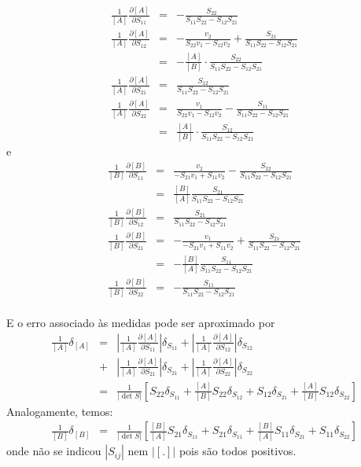 \begin{resol}
\begin{eqnarray}
\frac{1}{[ A ]}\frac{\partial [ A ]}{\partial S_{11}}&=&-\frac{S_{22}}{S_{11}S_{22}-S_{12}S_{21}}\\
\frac{1}{[ A ]}\frac{\partial [ A ]}{\partial S_{12}}&=&-\frac{v_2}{S_{22}v_1-S_{12}v_2}+\frac{S_{21}}{S_{11}S_{22}-S_{12}S_{21}}\\
&=&-\frac{[A]}{\left[B\right]}\cdot \frac{S_{22}}{S_{11}S_{22}-S_{12}S_{21}}\\
\frac{1}{[ A ]}\frac{\partial [ A ]}{\partial S_{21}}&=&\frac{S_{12}}{S_{11}S_{22}-S_{12}S_{21}}\\
\frac{1}{[ A ]}\frac{\partial [ A ]}{\partial S_{22}}&=&\frac{v_1}{S_{22}v_1-S_{12}v_2}-\frac{S_{11}}{S_{11}S_{22}-S_{12}S_{21}}\\
&=&\frac{[A]}{\left[B\right]}\cdot \frac{S_{12}}{S_{11}S_{22}-S_{12}S_{21}}
\end{eqnarray}
e
\begin{eqnarray}
\frac{1}{\left[ B \right]}\frac{\partial \left[ B \right]}{\partial S_{11}}&=&\frac{v_2}{-S_{21}v_1+S_{11}v_2}-\frac{S_{22}}{S_{11}S_{22}-S_{12}S_{21}}\\
&=&\frac{\left[B\right]}{[A]} \frac{S_{21}}{S_{11}S_{22}-S_{12}S_{21}}\\
\frac{1}{\left[ B \right]}\frac{\partial \left[ B \right]}{\partial S_{12}}&=&\frac{S_{21}}{S_{11}S_{22}-S_{12}S_{21}}\\
\frac{1}{\left[ B \right]}\frac{\partial \left[ B \right]}{\partial S_{21}}&=&-\frac{v_1}{-S_{21}v_1+S_{11}v_2}+\frac{S_{21}}{S_{11}S_{22}-S_{12}S_{21}}\\
&=&-\frac{\left[B\right]}{[A]}\frac{S_{11}}{S_{11}S_{22}-S_{12}S_{21}}\\
\frac{1}{\left[ B \right]}\frac{\partial \left[ B \right]}{\partial S_{22}}&=&-\frac{S_{11}}{S_{11}S_{22}-S_{12}S_{21}}\\
\end{eqnarray}

E o erro associado às medidas pode ser aproximado por
\begin{eqnarray}
\frac{1}{[A]}\delta_{[A]}&=&\left|\frac{1}{[ A ]}\frac{\partial [ A ]}{\partial S_{11}}\right| \delta_{S_{11}}+\left|\frac{1}{[ A ]}\frac{\partial [ A ]}{\partial S_{12}}\right| \delta_{S_{12}}\\
&+&\left|\frac{1}{[ A ]}\frac{\partial [ A ]}{\partial S_{21}}\right| \delta_{S_{21}}+\left|\frac{1}{[ A ]}\frac{\partial [ A ]}{\partial S_{22}}\right| \delta_{S_{22}}\\
&=&\frac{1}{\left|\det{S}\right|}\left[S_{22}\delta_{S_{11}}+\frac{[A]}{\left[B\right]}S_{22}\delta_{S_{12}}+S_{12}\delta_{S_{21}}+\frac{[A]}{\left[B\right]}S_{12}\delta_{S_{22}}\right]
\end{eqnarray}
Analogamente, temos:
\begin{eqnarray}
\frac{1}{[B]}\delta_{[B]}&=&\frac{1}{\left|\det{S}\right|}\left[\frac{[B]}{\left[A\right]}S_{21}\delta_{S_{11}}+S_{21}\delta_{S_{11}}+\frac{\left[B\right]}{[A]}S_{11}\delta_{S_{21}}+S_{11}\delta_{S_{22}}\right]
\end{eqnarray}
onde não se indicou $|S_{ij}|$ nem $|[.]|$ pois são todos positivos.



\end{resol}
